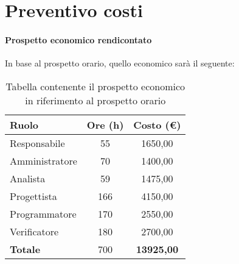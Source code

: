 \section{Preventivo costi}\label{section:Preventivo_costi}


\paragraph{Prospetto economico rendicontato}
In base al prospetto orario, quello economico sarà il seguente:

\begin{table}
	\begin{tabular}{l|cc}
	\rowcolor[HTML]{C0C0C0} 
	\textbf{Ruolo}                       & \textbf{Ore (h)}           & \textbf{Costo (€)}             \\ \hline
	\rowcolor[HTML]{EFEFEF} 
	Responsabile                         & 55                         & 1650,00                        \\
	\rowcolor[HTML]{DEDEDE} 
	Amministratore                       & 70                         & 1400,00                        \\
	\rowcolor[HTML]{E8E8E8} 
	Analista                             & 59                         & 1475,00                        \\
	\rowcolor[HTML]{DEDEDE} 
	Progettista                          & 166                        & 4150,00                        \\
	\rowcolor[HTML]{E8E8E8} 
	Programmatore 						 & 170 						  & 2550,00						   \\
	\rowcolor[HTML]{DEDEDE} 
	Verificatore                         & 180                        & 2700,00                        \\ \hline
	\rowcolor[HTML]{C0C0C0} 
	\textbf{Totale}                      & 700                        & \textbf{13925,00}             
	\end{tabular}
	\caption{Tabella contenente il prospetto economico in riferimento al prospetto orario}
\end{table}
